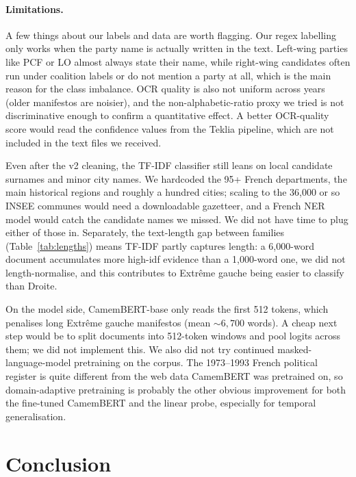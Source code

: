 \documentclass{article}
\begin{document}
\paragraph{Limitations.}
A few things about our labels and data are worth flagging. Our regex labelling only works when the party name is actually written in the text. Left-wing parties like PCF or LO almost always state their name, while right-wing candidates often run under coalition labels or do not mention a party at all, which is the main reason for the class imbalance. OCR quality is also not uniform across years (older manifestos are noisier), and the non-alphabetic-ratio proxy we tried is not discriminative enough to confirm a quantitative effect. A better OCR-quality score would read the confidence values from the Teklia pipeline, which are not included in the text files we received.

Even after the v2 cleaning, the TF-IDF classifier still leans on local candidate surnames and minor city names. We hardcoded the 95+ French departments, the main historical regions and roughly a hundred cities; scaling to the 36,000 or so INSEE communes would need a downloadable gazetteer, and a French NER model would catch the candidate names we missed. We did not have time to plug either of those in. Separately, the text-length gap between families (Table~\ref{tab:lengths}) means TF-IDF partly captures length: a 6,000-word document accumulates more high-idf evidence than a 1,000-word one, we did not length-normalise, and this contributes to Extr\^{e}me gauche being easier to classify than Droite.

On the model side, CamemBERT-base only reads the first 512 tokens, which penalises long Extr\^{e}me gauche manifestos (mean ${\sim}6{,}700$ words). A cheap next step would be to split documents into 512-token windows and pool logits across them; we did not implement this. We also did not try continued masked-language-model pretraining on the corpus. The 1973--1993 French political register is quite different from the web data CamemBERT was pretrained on, so domain-adaptive pretraining is probably the other obvious improvement for both the fine-tuned CamemBERT and the linear probe, especially for temporal generalisation.

\section{Conclusion}
\label{sec:conclusion}
\end{document}
